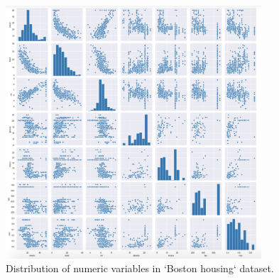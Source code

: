 \documentclass[letterpaper,12pt,twoside,]{pinp}
\begin{document}
\begin{figure}
\includegraphics[width=0.85\textwidth]{houseScatter.png}
\centering
\caption{Distribution of numeric variables in `Boston housing` dataset.}
\label{fig:houseScatter}
\end{figure}





\end{document}
